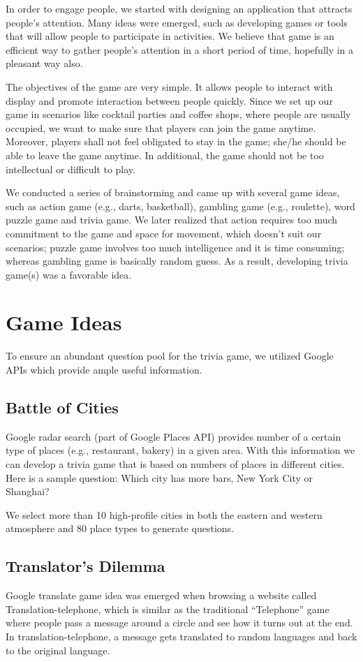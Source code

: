 \documentclass{sig-alternate}
\begin{document}
In order to engage people, we started with designing an application that attracts 
people's attention. Many ideas were emerged, such as developing games or tools that 
will allow people to participate in activities. We believe that game is an efficient way to 
gather people's attention in a short period of time, hopefully in a pleasant way also.

The objectives of the game are very simple. It allows people to interact with display and 
promote interaction between people quickly. Since we set up our game in scenarios like 
cocktail parties and coffee shops, where people are usually occupied, we want to make 
sure that players can join the game anytime. Moreover, players shall not feel obligated to stay in 
the game; she/he should be able to leave the game anytime. In additional, the game 
should not be too intellectual or difficult to play.

We conducted a series of brainstorming and came up with several game ideas, such as 
action game (e.g., darts, basketball), gambling game (e.g., roulette), word puzzle game 
and trivia game. We later realized that action requires too much commitment to the game 
and space for movement, which doesn't suit our scenarios; puzzle game involves too 
much intelligence and it is time consuming; whereas gambling game is basically random 
guess. As a result, developing trivia game(s) was a favorable idea.

\section{Game Ideas}
To ensure an abundant question pool for the trivia game, we utilized Google APIs which 
provide ample useful information.

\subsection{Battle of Cities}
Google radar search (part of Google Places API) provides number of a certain type of places 
(e.g., restaurant, bakery) in a given area. With this information we can develop a trivia game 
that is based on numbers of places in different cities. Here is a sample question: Which city 
has more bars, New York City or Shanghai?

We select more than 10 high-profile cities in both the eastern and western atmosphere and 
80 place types to generate questions.

\subsection{Translator's Dilemma}
Google translate game idea was emerged when browsing a website called 
Translation-telephone\cite{pamela:translation_telephone}, which is similar as the traditional ``Telephone'' game where people pass a message around a circle and see how it turns out at the end. In translation-telephone, a message gets translated to random languages and 
 back to the original language.
\end{document}
